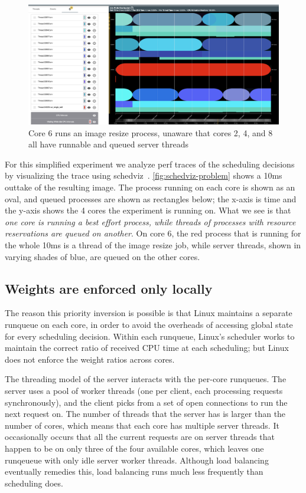 \begin{figure}[t]
    \centering
    \includegraphics[width=\columnwidth]{graphs/schedviz-problem.png}
    \caption{Core 6 runs an image resize process, unaware that cores 2, 4, and 8
    all have runnable and queued server threads}\label{fig:schedviz-problem}
\end{figure}

For this simplified experiment we analyze perf traces of the scheduling
decisions by visualizing the trace using schedviz~\cite{schedviz-tool}.
\autoref{fig:schedviz-problem} shows a 10ms outtake of the resulting image. The
process running on each core is shown as an oval, and queued processes are shown
as rectangles below; the x-axis is time and the y-axis shows the 4 cores the
experiment is running on. What we see is that \textit{one core is running a best
effort process, while threads of processes with resource reservations are queued
on another}. On core 6, the red process that is running for the whole 10ms is a
thread of the image resize job, while server threads, shown in varying shades of
blue, are queued on the other cores.

\subsection{Weights are enforced only locally}\label{ss:problem:weights-local}

The reason this priority inversion is possible is that Linux maintains a
separate runqueue on each core, in order to avoid the overheads of accessing
global state for every scheduling decision. Within each runqueue, Linux's
scheduler works to maintain the correct ratio of received CPU time at each
scheduling; but Linux does not enforce the weight ratios across cores. 

The threading model of the server interacts with the per-core runqueues. The
server uses a pool of worker threads (one per client, each processing requests
synchronously), and the client picks from a set of open connections to run the
next request on. The number of threads that the server has is larger than the
number of cores, which means that each core has multiple server threads. It
occasionally occurs that all the current requests are on server threads that
happen to be on only three of the four available cores, which leaves one
runqeueue with only idle server worker threads. Although load balancing
eventually remedies this, load balancing runs much less frequently than
scheduling does.

